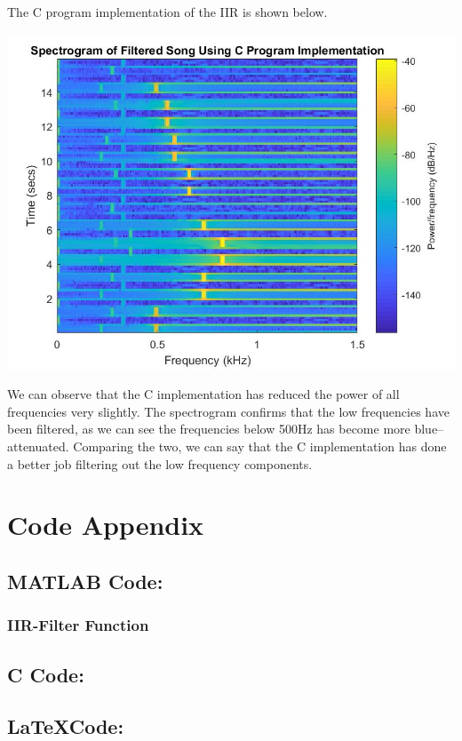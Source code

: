 \documentclass{article}
\begin{document}
        \vspace{2mm}
        The C program implementation of the IIR is shown below.
        \begin{center}
            \includegraphics[scale=0.38]{task8a.jpg}
        \end{center}
        We can observe that the C implementation has reduced the power of all frequencies very slightly. The spectrogram confirms that the low frequencies have been filtered, as we can see the frequencies below 500Hz has become more blue--attenuated. Comparing the two, we can say that the C implementation has done a better job filtering out the low frequency components.
\newpage
\section{Code Appendix}
    \subsection{MATLAB Code:}
        
        \vspace{5mm}
        \subsubsection{IIR-Filter Function}
         
    \newpage
    \subsection{C Code:}
        
    \newpage
    \subsection{\LaTeX Code:}
        
\end{document}
